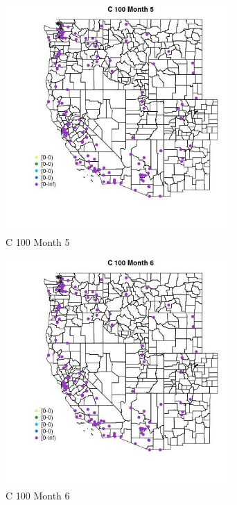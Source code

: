 \begin{figure} 
\centering  
\includegraphics[width=0.77\textwidth]{Code_Outputs/Report_ML_input_PM25_Step4_part_e_de_duplicated_aves_MapObsMo5C_100.jpg} 
\caption{\label{fig:Report_ML_input_PM25_Step4_part_e_de_duplicated_avesMapObsMo5C_100}C 100 Month 5} 
\end{figure} 
 

\clearpage 

\begin{figure} 
\centering  
\includegraphics[width=0.77\textwidth]{Code_Outputs/Report_ML_input_PM25_Step4_part_e_de_duplicated_aves_MapObsMo6C_100.jpg} 
\caption{\label{fig:Report_ML_input_PM25_Step4_part_e_de_duplicated_avesMapObsMo6C_100}C 100 Month 6} 
\end{figure} 
 

